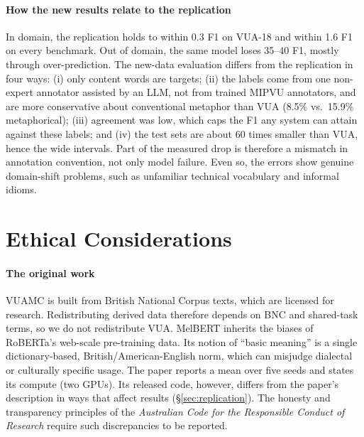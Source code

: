 \documentclass[11pt]{article}
\begin{document}
\paragraph{How the new results relate to the replication} In domain, the replication holds to within 0.3 F1 on VUA-18 and within 1.6 F1 on every benchmark. Out of domain, the same model loses 35--40 F1, mostly through over-prediction. The new-data evaluation differs from the replication in four ways: (i) only content words are targets; (ii) the labels come from one non-expert annotator assisted by an LLM, not from trained MIPVU annotators, and are more conservative about conventional metaphor than VUA (8.5\% vs.\ 15.9\% metaphorical); (iii) agreement was low, which caps the F1 any system can attain against these labels; and (iv) the test sets are about 60 times smaller than VUA, hence the wide intervals. Part of the measured drop is therefore a mismatch in annotation convention, not only model failure. Even so, the errors show genuine domain-shift problems, such as unfamiliar technical vocabulary and informal idioms.

\section{Ethical Considerations}
\label{sec:ethics}

\paragraph{The original work} VUAMC is built from British National Corpus texts, which are licensed for research. Redistributing derived data therefore depends on BNC and shared-task terms, so we do not redistribute VUA. MelBERT inherits the biases of RoBERTa's web-scale pre-training data. Its notion of ``basic meaning'' is a single dictionary-based, British/American-English norm, which can misjudge dialectal or culturally specific usage. The paper reports a mean over five seeds and states its compute (two GPUs). Its released code, however, differs from the paper's description in ways that affect results (\S\ref{sec:replication}). The honesty and transparency principles of the \emph{Australian Code for the Responsible Conduct of Research} \citep{nhmrc2018code} require such discrepancies to be reported.
\end{document}
